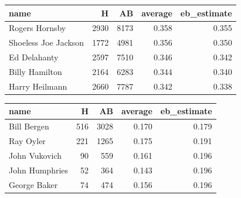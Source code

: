 \documentclass[]{book}
\newenvironment{Shaded}{\begin{snugshade}}{\end{snugshade}}
\newcommand{\CommentTok}[1]{\textcolor[rgb]{0.56,0.35,0.01}{\textit{#1}}}
\newcommand{\DataTypeTok}[1]{\textcolor[rgb]{0.13,0.29,0.53}{#1}}
\newcommand{\DecValTok}[1]{\textcolor[rgb]{0.00,0.00,0.81}{#1}}
\newcommand{\KeywordTok}[1]{\textcolor[rgb]{0.13,0.29,0.53}{\textbf{#1}}}
\newcommand{\NormalTok}[1]{#1}
\newcommand{\OperatorTok}[1]{\textcolor[rgb]{0.81,0.36,0.00}{\textbf{#1}}}
\newcommand{\StringTok}[1]{\textcolor[rgb]{0.31,0.60,0.02}{#1}}
\begin{document}
\begin{Shaded}
\end{Shaded}

\begin{tabular}{l|r|r|r|r}
\hline
name & H & AB & average & eb\_estimate\\
\hline
Rogers Hornsby & 2930 & 8173 & 0.358 & 0.355\\
\hline
Shoeless Joe Jackson & 1772 & 4981 & 0.356 & 0.350\\
\hline
Ed Delahanty & 2597 & 7510 & 0.346 & 0.342\\
\hline
Billy Hamilton & 2164 & 6283 & 0.344 & 0.340\\
\hline
Harry Heilmann & 2660 & 7787 & 0.342 & 0.338\\
\hline
\end{tabular}

\begin{Shaded}
\end{Shaded}

\begin{tabular}{l|r|r|r|r}
\hline
name & H & AB & average & eb\_estimate\\
\hline
Bill Bergen & 516 & 3028 & 0.170 & 0.179\\
\hline
Ray Oyler & 221 & 1265 & 0.175 & 0.191\\
\hline
John Vukovich & 90 & 559 & 0.161 & 0.196\\
\hline
John Humphries & 52 & 364 & 0.143 & 0.196\\
\hline
George Baker & 74 & 474 & 0.156 & 0.196\\
\hline
\end{tabular}
\end{document}
